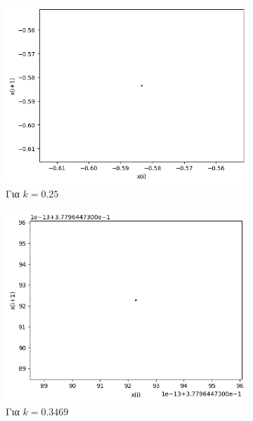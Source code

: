 \begin{figure}[ht]
	\centering
	
	\begin{subfigure}[b]{0.4\textwidth}
		\centering
		\includegraphics[width=\textwidth]{LateX images/graphs q07/g3}
		\caption{Για $k=0.25$}
		\label{f:k37}
	\end{subfigure}
	\hfill
	\begin{subfigure}[b]{0.4\textwidth}
		\centering
		\includegraphics[width=\textwidth]{LateX images/graphs q07/g4}
		\caption{Για $k=0.3469$}
		\label{f:k38}
	\end{subfigure}
	\hfill
	\begin{subfigure}[b]{0.4\textwidth}

\end{subfigure}
\end{figure}
